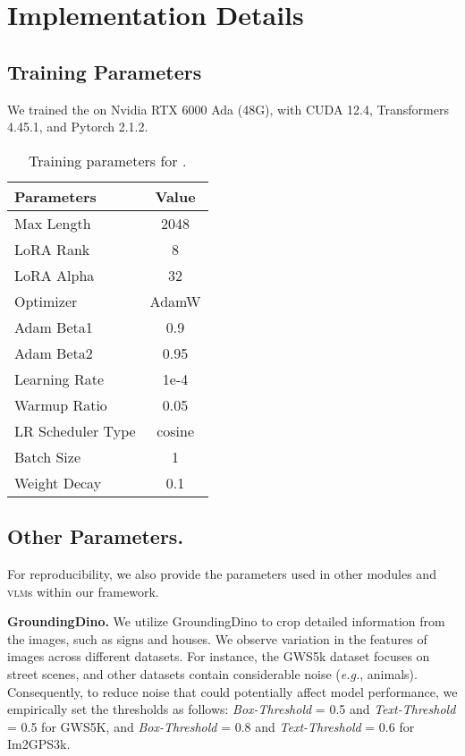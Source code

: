 \appendix

\section{Implementation Details}
\label{apd:implementations}

\subsection{Training Parameters}

We trained the \macname on Nvidia RTX 6000 Ada (48G), with CUDA 12.4, Transformers 4.45.1, and Pytorch 2.1.2.

\begin{table}[htbp]
\centering
\small
\begin{tabular}{l c}
\toprule
\textbf{Parameters} & \textbf{Value} \\
\midrule
Max Length & 2048 \\
LoRA Rank & 8 \\
LoRA Alpha & 32 \\
Optimizer & AdamW \\
Adam Beta1 & 0.9 \\
Adam Beta2 & 0.95 \\
Learning Rate & 1e-4 \\
Warmup Ratio & 0.05 \\
LR Scheduler Type & cosine \\
Batch Size & 1 \\
Weight Decay & 0.1 \\
\bottomrule
\end{tabular}
\caption{
Training parameters for \macname.
}
\label{tab:training_parameters}
\end{table}


\subsection{Other Parameters.}

For reproducibility, we also provide the parameters used in other modules and \textsc{vlm}s within our framework.

\textbf{GroundingDino.} We utilize GroundingDino to crop detailed information from the images, such as signs and houses. We observe variation in the features of images across different datasets. For instance, the GWS5k dataset focuses on street scenes, and other datasets contain considerable noise (\textit{e.g.}, animals). Consequently, to reduce noise that could potentially affect model performance, we empirically set the thresholds as follows: \textit{Box-Threshold} = 0.5 and \textit{Text-Threshold} = 0.5 for GWS5K, and \textit{Box-Threshold} = 0.8 and \textit{Text-Threshold} = 0.6 for Im2GPS3k.

